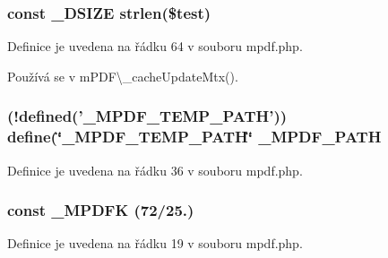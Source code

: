 \hypertarget{mpdf_8php_a7966b46681b5b845bc4ed993f3885b0b}{
\subsubsection[{\-\_\-\-D\-S\-I\-Z\-E}]{\setlength{\rightskip}{0pt plus 5cm}const \-\_\-\-D\-S\-I\-Z\-E strlen(\$test)}}\label{mpdf_8php_a7966b46681b5b845bc4ed993f3885b0b}


Definice je uvedena na řádku 64 v souboru mpdf.\-php.



Používá se v m\-P\-D\-F\textbackslash{}\-\_\-cache\-Update\-Mtx().

\hypertarget{mpdf_8php_a7d620d14eb10b0b8a3c1420281906e66}{
\subsubsection[{\-\_\-\-M\-P\-D\-F\-\_\-\-P\-A\-T\-H}]{ (!defined('\-\_\-\-M\-P\-D\-F\-\_\-\-T\-E\-M\-P\-\_\-\-P\-A\-T\-H')) define(\char`\"{}\-\_\-\-M\-P\-D\-F\-\_\-\-T\-E\-M\-P\-\_\-\-P\-A\-T\-H\char`\"{} \-\_\-\-M\-P\-D\-F\-\_\-\-P\-A\-T\-H}}\label{mpdf_8php_a7d620d14eb10b0b8a3c1420281906e66}


Definice je uvedena na řádku 36 v souboru mpdf.\-php.

\hypertarget{mpdf_8php_a1620fd00db2354fd97b5e01eba4bb7ab}{
\subsubsection[{\-\_\-\-M\-P\-D\-F\-K}]{\setlength{\rightskip}{0pt plus 5cm}const \-\_\-\-M\-P\-D\-F\-K (72/25.)}}\label{mpdf_8php_a1620fd00db2354fd97b5e01eba4bb7ab}


Definice je uvedena na řádku 19 v souboru mpdf.\-php.



